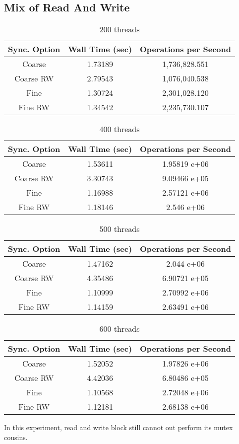 \documentclass[11pt]{article}
\begin{document}
\subsection{Mix of Read And Write}
\begin{table}[H]
	\centering
	\begin{tabular}{|c|c|c|}
		\hline
		Sync. Option &Wall Time (sec)	&Operations per Second	\\
		\hline
		Coarse &1.73189	&1,736,828.551\\
		\hline
		Coarse RW &2.79543 &1,076,040.538\\
		\hline
		Fine	&1.30724	&2,301,028.120\\
		\hline
		Fine RW	&1.34542	&2,235,730.107\\
		\hline
	\end{tabular}
	\caption{200 threads}
\end{table}
\begin{table}[H]
	\centering
	\begin{tabular}{|c|c|c|}
		\hline
		Sync. Option &Wall Time (sec)	&Operations per Second	\\
		\hline
		Coarse & 1.53611	&1.95819 e+06\\
		\hline
		Coarse RW &3.30743 &9.09466 e+05\\
		\hline
		Fine	&1.16988	&2.57121 e+06\\
		\hline
		Fine RW	&1.18146	&2.546 e+06\\
		\hline
	\end{tabular}
	\caption{400 threads}
\end{table}
\begin{table}[H]
	\centering
	\begin{tabular}{|c|c|c|}
		\hline
		Sync. Option &Wall Time (sec)	&Operations per Second	\\
		\hline
		Coarse &1.47162	&2.044 e+06\\
		\hline
		Coarse RW &4.35486 &6.90721 e+05\\
		\hline
		Fine	&1.10999	&2.70992 e+06\\
		\hline
		Fine RW	&1.14159	&2.63491 e+06\\
		\hline
	\end{tabular}
	\caption{500 threads}
\end{table}
\begin{table}[H]
	\centering
	\begin{tabular}{|c|c|c|}
		\hline
		Sync. Option &Wall Time (sec)	&Operations per Second	\\
		\hline
		Coarse &1.52052 &1.97826 e+06\\
		\hline
		Coarse RW &4.42036 &6.80486 e+05\\
		\hline
		Fine	&1.10568	&2.72048 e+06\\
		\hline
		Fine RW	&1.12181	&2.68138 e+06\\
		\hline
	\end{tabular}
	\caption{600 threads}
\end{table}
In this experiment, read and write block still cannot out perform its mutex cousins.
\end{document}

